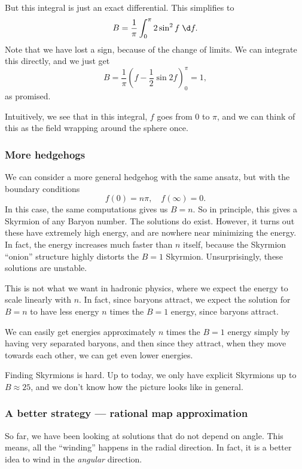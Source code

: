 \documentclass[a4paper]{article}
\begin{document}
But this integral is just an exact differential. This simplifies to
\[
  B = \frac{1}{\pi} \int_0^\pi 2 \sin^2 f \;\d f.
\]
Note that we have lost a sign, because of the change of limits. We can integrate this directly, and we just get
\[
  B = \frac{1}{\pi}\left(f - \frac{1}{2} \sin 2f\right)^\pi_0 = 1,
\]
as promised.

Intuitively, we see that in this integral, $f$ goes from $0$ to $\pi$, and we can think of this as the field wrapping around the sphere once.

\subsubsection*{More hedgehogs}
We can consider a more general hedgehog with the same ansatz, but with the boundary conditions
\[
  f(0) = n\pi,\quad f(\infty) = 0.
\]
In this case, the same computations gives us $B = n$. So in principle, this gives a Skyrmion of any Baryon number. The solutions do exist. However, it turns out these have extremely high energy, and are nowhere near minimizing the energy. In fact, the energy increases much faster than $n$ itself, because the Skyrmion ``onion'' structure highly distorts the $B = 1$ Skyrmion. Unsurprisingly, these solutions are unstable.

This is not what we want in hadronic physics, where we expect the energy to scale linearly with $n$. In fact, since baryons attract, we expect the solution for $B = n$ to have less energy $n$ times the $B = 1$ energy, since baryons attract.

We can easily get energies approximately $n$ times the $B = 1$ energy simply by having very separated baryons, and then since they attract, when they move towards each other, we can get even lower energies.

Finding Skyrmions is hard. Up to today, we only have explicit Skyrmions up to $B \approx 25$, and we don't know how the picture looks like in general.

\subsubsection*{A better strategy --- rational map approximation}
So far, we have been looking at solutions that do not depend on angle. This means, all the ``winding'' happens in the radial direction. In fact, it is a better idea to wind in the \emph{angular} direction.
\end{document}

